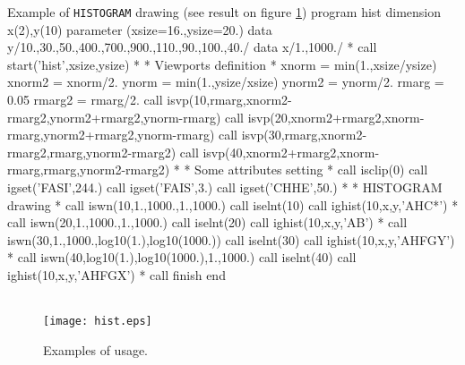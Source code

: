 \begin{minipage}{\textwidth}
\begin{XMPt}{Example of {\tt HISTOGRAM} drawing (see result on figure 
\ref{HIST})}
      program hist 
      dimension x(2),y(10)
      parameter (xsize=16.,ysize=20.)
      data y/10.,30.,50.,400.,700.,900.,110.,90.,100.,40./
      data x/1.,1000./
*
      call start('hist',xsize,ysize)
*
*              Viewports definition
*
      xnorm  = min(1.,xsize/ysize)
      xnorm2 = xnorm/2.
      ynorm  = min(1.,ysize/xsize)
      ynorm2 = ynorm/2.
      rmarg  = 0.05
      rmarg2 = rmarg/2.
      call isvp(10,rmarg,xnorm2-rmarg2,ynorm2+rmarg2,ynorm-rmarg)
      call isvp(20,xnorm2+rmarg2,xnorm-rmarg,ynorm2+rmarg2,ynorm-rmarg)
      call isvp(30,rmarg,xnorm2-rmarg2,rmarg,ynorm2-rmarg2)
      call isvp(40,xnorm2+rmarg2,xnorm-rmarg,rmarg,ynorm2-rmarg2)
*
*              Some attributes setting
*
      call isclip(0)
      call igset('FASI',244.)
      call igset('FAIS',3.)
      call igset('CHHE',50.)
*
*              HISTOGRAM drawing
*
      call iswn(10,1.,1000.,1.,1000.)
      call iselnt(10)
      call ighist(10,x,y,'AHC*')
*
      call iswn(20,1.,1000.,1.,1000.)
      call iselnt(20)
      call ighist(10,x,y,'AB')
*
      call iswn(30,1.,1000.,log10(1.),log10(1000.))
      call iselnt(30)
      call ighist(10,x,y,'AHFGY')
*
      call iswn(40,log10(1.),log10(1000.),1.,1000.)
      call iselnt(40)
      call ighist(10,x,y,'AHFGX')
*
      call finish
      end
\end{XMPt}
\end{minipage}

\begin{figure}[p]
\begin{center}
\mbox{}\\[-15mm]
\texttt{[image: hist.eps]}
\end{center}
\caption{Examples of \protect{} usage.}
\label{HIST}
\end{figure}

\clearpage
 
